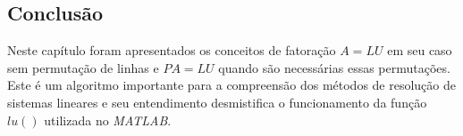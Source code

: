 \documentclass[12pt]{article}
\begin{document}
\subsection{Conclusão}
Neste capítulo foram apresentados os conceitos de fatoração $A=LU$ em seu caso sem permutação de linhas e $PA=LU$ quando são necessárias essas permutações. Este é um algoritmo importante para a compreensão dos métodos de resolução de sistemas lineares e seu entendimento desmistifica o funcionamento da função $lu()$ utilizada no \textit{MATLAB}.
\end{document}
